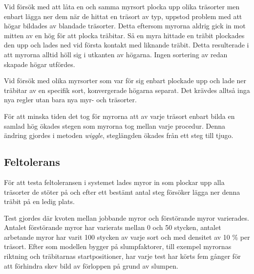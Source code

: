 \documentclass[titlepage, a4paper, 12pt]{article}
\begin{document}
Vid försök med att låta en och samma myrsort plocka upp olika
träsorter men enbart lägga ner dem när de hittat en träsort av typ,
uppstod problem med att högar bildades av blandade träsorter. Detta
eftersom myrorna aldrig gick in mot mitten av en hög för att plocka
träbitar. Så en myra hittade en träbit plockades den upp och lades ned
vid första kontakt med liknande träbit. Detta resulterade i att
myrorna alltid höll sig i utkanten av högarna. Ingen sortering av
redan skapade högar utfördes.

Vid försök med olika myrsorter som var för sig enbart plockade upp och
lade ner träbitar av en specifik sort, konvergerade högarna
separat. %
Det krävdes alltså inga nya regler utan bara nya myr- och
träsorter.

För att minska tiden det tog för myrorna att av varje träsort enbart
bilda en samlad hög ökades stegen som myrorna tog mellan varje
procedur. Denna ändring gjordes i metoden \textit{wiggle}, steglängden
ökades från ett steg till tjugo.

\subsection{Feltolerans}


För att testa feltoleransen i systemet lades myror in som plockar upp
alla träsorter de stöter på och efter ett bestämt antal steg försöker
lägga ner denna träbit på en ledig plats.

Test gjordes där kvoten mellan jobbande myror och förstörande myror
varierades. Antalet förstörande myror har varierats mellan 0 och 50 stycken,
antalet arbetande myror har varit 100 stycken av varje sort och med
densitet av 10 \% per träsort. Efter som modellen bygger på
slumpfaktorer, till exempel myrornas riktning och träbitarnas
startpositioner, har varje test har körts fem gånger för att förhindra
skev bild av förloppen på grund av slumpen. 
\end{document}
